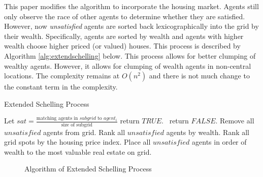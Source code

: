 \documentclass[11pt]{asaproc}
\newcommand{\1}{\mathbb{1}}
\begin{document}
This paper modifies the algorithm to incorporate the housing market. Agents still only observe the race of other agents to determine whether they are satisfied. However, now \textit{unsatisfied} agents are sorted back lexicographically into the grid by their wealth. Specifically, agents are sorted by wealth and agents with higher wealth choose higher priced (or valued) houses. This process is described by Algorithm \ref{alg:extendschelling} below. This process allows for better clumping of wealthy agents. However, it allows for clumping of wealth agents in non-central locations. The complexity remains at $O(n^2)$ and there is not much change to the constant term in the complexity.

 \begin{algorithm}[htbp!]
  \caption{Extended Schelling Process}\label{alg:extendschelling}
  \begin{algorithmic}[1]
        	\State Let $sat = \frac{\mbox{matching agents in $subgrid$ to $agent_i$}}{\mbox{size of subgrid}}$
       			\State return $TRUE$. 
                \Else \ return $FALSE$. 
    		\EndIf
        \EndProcedure
        	\State Remove all $unsatisfied$ agents from grid.
            \State Rank all $unsatisfied$ agents by wealth.
            \State Rank all grid spots by the housing price index.
            \State Place all $unsatisfied$ agents in order of wealth to the most valuable real estate on grid.
        \EndWhile{}
  	\EndFunction{}
  \end{algorithmic}
  \end{algorithm}
  \begin{figure}[h!]
\caption{Algorithm of Extended Schelling Process}
\end{figure}
\end{document}
